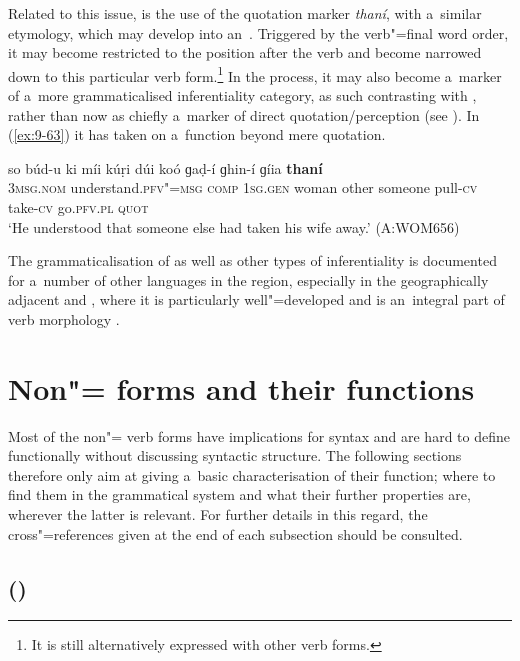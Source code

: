 Related to this issue, is the use of the quotation marker \textit{thaní}, with a~similar etymology, which may develop into an~. Triggered by the verb"=final word order, it may become restricted to the position after the  verb and become narrowed down to this particular verb form.\footnote{It is still alternatively expressed with other verb forms.} In the process, it may also become a~marker of a~more grammaticalised inferentiality category, as such contrasting with , rather than now as chiefly a~marker of direct quotation/perception (see ). In (\ref{ex:9-63}) it has taken on a~function beyond mere quotation.

\ea
\label{ex:9-63}
\gll so búd-u ki míi kúṛi dúi koó ɡaḍ-í ɡhin-í ɡíia \textbf{thaní}  \\
\textsc{3msg.nom} understand.\textsc{pfv"=msg} \textsc{comp} \textsc{1sg.gen} woman  other someone pull-\textsc{cv} take-\textsc{cv} go.\textsc{pfv.pl} \textsc{quot} \\
\glt `He understood that someone else had taken his wife away.' (A:WOM656)
\z

The grammaticalisation of  as well as other types of inferentiality is documented for a~number of other languages in the region, especially in the geographically adjacent \iliKhowar and \iliKalasha, where it is particularly well"=developed and is an~integral part of verb morphology \citep{bashir1996}. 


\section{Non"= forms and their functions}
\label{sec:9-3}

Most of the non"= verb forms have implications for syntax and are hard to define functionally without discussing syntactic structure. The following sections therefore only aim at giving a~basic characterisation of their function; where to find them in the grammatical system and what their further  properties are, wherever the latter is relevant. For further details in this regard, the cross"=references given at the end of each subsection should be consulted. 


\subsection{ () }
\label{subsec:9-3-1}


